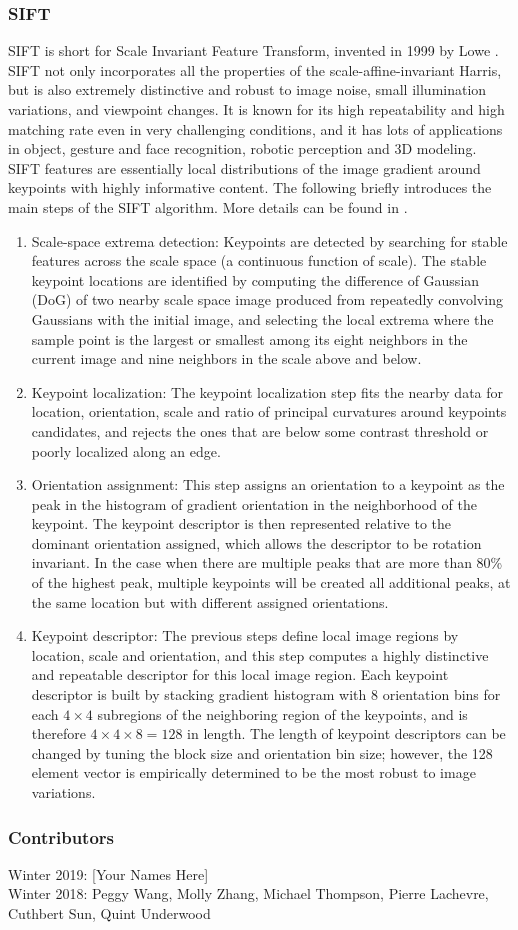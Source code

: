 \documentclass[twoside]{article}
\begin{document}
\subsubsection{SIFT}
SIFT is short for Scale Invariant Feature Transform, invented in 1999 by Lowe \cite{SIFT}. SIFT not only incorporates all the properties of the scale-affine-invariant Harris, but is also extremely distinctive and robust to image noise, small illumination variations, and viewpoint changes. It is known for its high repeatability and high matching rate even in very challenging conditions, and it has lots of applications in object, gesture and face recognition, robotic perception and 3D modeling. SIFT features are essentially local distributions of the image gradient around keypoints with highly informative content. The following briefly introduces the main steps of the SIFT algorithm. More details can be found in \cite{SIFT}.
\begin{enumerate}
\item Scale-space extrema detection: Keypoints are detected by searching for stable features across the scale space (a continuous function of scale). The stable keypoint locations are identified by computing the difference of Gaussian (DoG) of two nearby scale space image produced from repeatedly convolving Gaussians with the initial image, and selecting the local extrema where the sample point is the largest or smallest among its eight neighbors in the current image and nine neighbors in the scale above and below.
\item Keypoint localization: The keypoint localization step fits the nearby data for location, orientation, scale and ratio of principal curvatures around keypoints candidates, and rejects the ones that are below some contrast threshold or poorly localized along an edge.
\item Orientation assignment: This step assigns an orientation to a keypoint as the peak in the histogram of gradient orientation in the neighborhood of the keypoint. The keypoint descriptor is then represented relative to the dominant orientation assigned, which allows the descriptor to be rotation invariant. In the case when there are multiple peaks that are more than 80\% of the highest peak, multiple keypoints will be created all additional peaks, at the same location but with different assigned orientations.
\item Keypoint descriptor: The previous steps define local image regions by location, scale and orientation, and this step computes a highly distinctive and repeatable descriptor for this local image region. Each keypoint descriptor is built by stacking gradient histogram with 8 orientation bins for each $4\times 4 $ subregions of the neighboring region of the keypoints, and is therefore $4\times 4 \times 8 = 128$ in length. The length of keypoint descriptors can be changed by tuning the block size and orientation bin size; however, the 128 element vector is empirically determined to be the most robust to image variations.

\end{enumerate}



\subsubsection*{Contributors}
Winter 2019: [Your Names Here]
\\
Winter 2018: Peggy Wang, Molly Zhang, Michael Thompson, Pierre Lachevre, Cuthbert Sun, Quint Underwood
\end{document}
